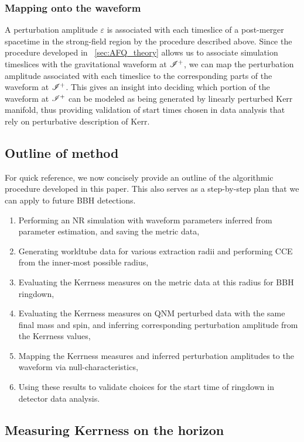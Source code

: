 \subsubsection{Mapping onto the waveform}
\label{AmpMapOnFni}
A perturbation amplitude $\varepsilon$ is associated with each timeslice of a post-merger spacetime in the strong-field region by the procedure described above. Since the procedure developed in ~\ref{sec:AFQ_theory} allows us to associate simulation timeslices with the gravitational waveform at $\mathscr{I^+}$, we can map the perturbation amplitude associated with each timeslice to the corresponding parts of the waveform at $\mathscr{I^+}$.  This gives an insight into deciding which portion of the waveform at $\mathscr{I^+}$ can be modeled as being generated by linearly perturbed Kerr manifold, thus providing validation of start times chosen in data analysis that rely on perturbative description of Kerr. 

\subsection{Outline of method}
\label{sec:MethodSummary}


For quick reference, we now concisely provide an outline of the algorithmic procedure developed in this paper. This also serves as a step-by-step plan that we can apply to future BBH detections.

\begin{enumerate}
\item Performing an NR simulation with waveform parameters inferred from parameter estimation, and saving the metric data,
\item Generating worldtube data for various extraction radii and performing CCE from the inner-most possible radius,
\item Evaluating the Kerrness measures on the metric data at this radius for BBH ringdown, 
\item Evaluating the Kerrness measures on QNM perturbed data with the same final mass and spin, and inferring corresponding perturbation amplitude from the Kerrness values,
\item Mapping the Kerrness measures and inferred perturbation amplitudes to the waveform via null-characteristics,
\item Using these results to validate choices for the start time of ringdown in detector data analysis.
\end{enumerate}


\subsection{Measuring Kerrness on the horizon}
\label{sec:MultipolarTheory}

